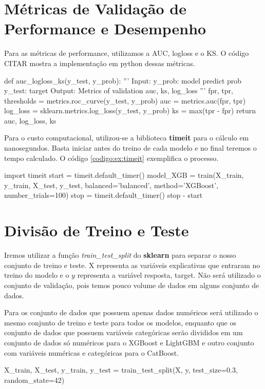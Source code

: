 \section{Métricas de Validação de Performance e Desempenho}
Para as métricas de performance, utilizamos a AUC, logloss e o KS. O código CITAR mostra a implementação em python dessas métricas.
\begin{codigo}[caption={Código implementado o cálculo da AUC, logloss e o KS.}, label={codigo:im:auc:ks:log}, language=Python, breaklines=true]
def auc_logloss_ks(y_test, y_prob):
    '''
    Input:
        y_prob: model predict prob
        y_test: target
    Output: Metrics of validation
        auc, ks, log_loss
    '''
    fpr, tpr, thresholds = metrics.roc_curve(y_test, y_prob)
    auc = metrics.auc(fpr, tpr)
    log_loss = sklearn.metrics.log_loss(y_test, y_prob)
    ks = max(tpr - fpr)
    return auc, log_loss, ks
\end{codigo}

Para o custo computacional, utilizou-se a biblioteca \textbf{timeit} para o cálculo em nanosegundos. Basta iniciar antes do treino de cada modelo e no final teremos o tempo calculado. O código \ref{codigo:ex:timeit} exemplifica o processo.
\begin{codigo}[caption={Importação da biblioteca timeit e o cálculo em segundos da execução do código.}, label={codigo:ex:timeit}, language=Python, breaklines=true]
import timeit
start = timeit.default_timer()
model_XGB = train(X_train, y_train, X_test, y_test, balanced='balanced', method='XGBoost', number_trials=100)
stop = timeit.default_timer()
stop - start
\end{codigo}

\section{Divisão de Treino e Teste}
Iremos utilizar a função \textit{train\_test\_split} do \textbf{sklearn} para separar o nosso conjunto de treino e teste. $\text{X}$ representa as variáveis explicativas que entraram no treino do modelo e o $y$ representa a variável resposta, target. Não será utilizado o conjunto de validação, pois temos pouco volume de dados em alguns conjunto de dados.

Para os conjunto de dados que possuem apenas dados numéricos será utilizado o mesmo conjunto de treino e teste para todos os modelos, enquanto que os conjunto de dados que possuem variáveis categóricas serão divididos em um conjunto de dados só numéricos para o XGBoost e LightGBM e outro conjunto com variáveis numéricas e categóricas para o CatBoost.
\begin{codigo}[caption={Exemplo da divisão dos conjuntos de treino e teste.}, label={codigo:ex:trainteste_split}, language=Python, breaklines=true]
X_train, X_test, y_train, y_test = train_test_split(X, y, test_size=0.3, random_state=42)
\end{codigo}

